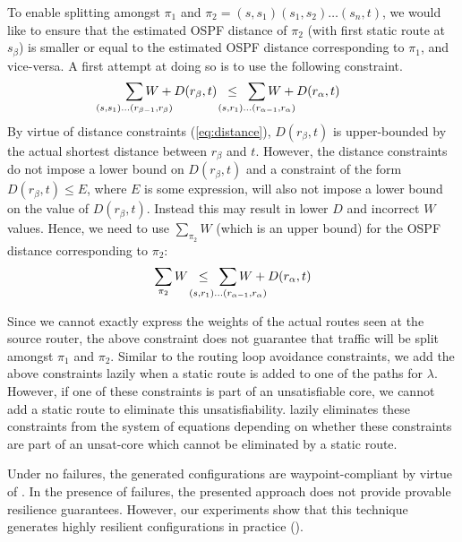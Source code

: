 To enable splitting amongst
$\pi_1$ and $\pi_2 = (s, s_1)(s_1, s_2)\ldots(s_n, t)$, we 
would like to ensure that 
the estimated OSPF distance of $\pi_2$ (with first static route at $s_\beta$)
is smaller or equal to 
the estimated OSPF distance corresponding to $\pi_1$, and vice-versa.
A first attempt at doing so is to use the following constraint.
\begin{equation}
	\sum_{\mathclap{\substack{(s, s_1)\ldots(r_{\beta-1}, r_\beta)}}} W + D(r_\beta, t) 
	 \hspace{0.2cm} \leq \hspace{0.2cm} \sum_{\mathclap{\substack{(s, r_1)\ldots(r_{\alpha-1}, r_\alpha)}}} W + D(r_\alpha, t)
\end{equation}
By virtue of distance constraints (\ref{eq:distance}), 
$D(r_\beta,t)$ is upper-bounded by the actual shortest
distance between $r_\beta$ and $t$.  However, the distance
constraints do not impose a lower bound on $D(r_\beta,t)$
and
 a constraint of the form $D(r_\beta,t) \leq E$, where 
$E$ is some expression, will also not impose a lower bound
on the value of $D(r_\beta,t)$.
Instead this may result in lower $D$ and incorrect 
$W$ values.
Hence,  we need to use $\sum_{\pi_2}W$ (which is an upper bound)
for the OSPF distance corresponding to 
$\pi_2$:
\begin{equation}
\sum_{\mathclap{\substack{\pi_2}}} W 
\hspace{0.2cm} \leq \hspace{0.2cm} \sum_{\mathclap{\substack{(s, r_1)\ldots(r_{\alpha-1}, r_\alpha)}}} W + D(r_\alpha, t)
\end{equation}

Since we cannot exactly express the weights of the actual routes seen 
at the source router, the above constraint does not  guarantee 
that traffic will be split amongst
$\pi_1$ and $\pi_2$. 
Similar to the routing loop avoidance constraints, we add the
above constraints lazily when a static route is added to one of the
paths for $\lambda$. However, if one of these constraints is part of 
an unsatisfiable core, we cannot add a static route to eliminate 
this unsatisfiability. \name lazily eliminates these constraints from the
system of equations depending on whether these constraints are part of 
an unsat-core which cannot be eliminated by a static route. 

Under no failures, the generated configurations are
waypoint-compliant by virtue of . 
In the presence of failures, the presented approach does not provide provable resilience guarantees.
However, our experiments show that
this technique generates highly resilient configurations 
in practice (). 


